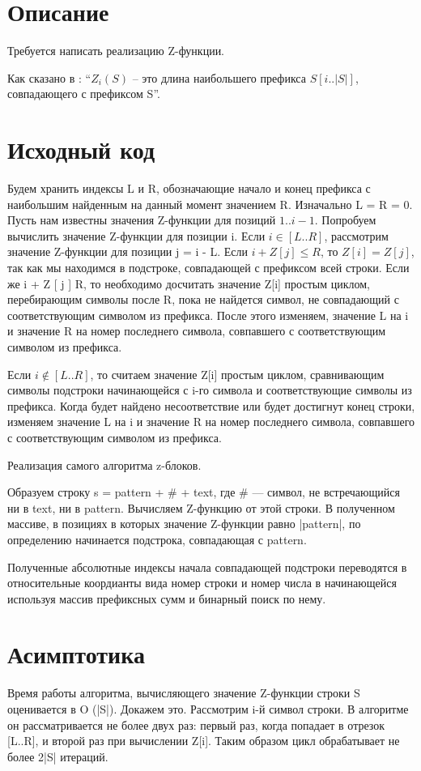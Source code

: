 \section{Описание}
Требуется написать реализацию Z-функции.

Как сказано в \cite{Gusfield}: \enquote{$Z_i(S)$ -- это длина наибольшего префикса $S[i..|S|]$, совпадающего с префиксом S}.

\section{Исходный код}
Будем хранить индексы L и R, обозначающие начало и конец префикса с наибольшим найденным на данный момент значением R. Изначально L = R = 0. 
Пусть нам известны значения Z-функции для позиций $1..i - 1$. Попробуем вычислить значение Z-функции для позиции i. Если $i \in [L..R]$, 
рассмотрим значение Z-функции для позиции j = i - L. Если $i + Z [ j ] \leq R$, то $Z [ i ] = Z [ j ]$, так как мы находимся в подстроке,
совпадающей с префиксом всей строки. Если же i + Z [ j ]  R, то необходимо досчитать значение Z[i] простым циклом, перебирающим символы 
после R, пока не найдется символ, не совпадающий с соответствующим символом из префикса. После этого изменяем, значение L на i и значение 
R на номер последнего символа, совпавшего с соответствующим символом из префикса.

Если $i \notin [L..R]$, то считаем значение Z[i] простым циклом, сравнивающим символы подстроки начинающейся с i-го
символа и соответствующие символы из префикса. Когда будет найдено несоответствие или будет достигнут конец строки, изменяем значение L 
на i и значение R на номер последнего символа, совпавшего с соответствующим символом из префикса. 

Реализация самого алгоритма z-блоков.

Образуем строку s = pattern + \# + text, где \# — символ, не встречающийся ни в text, ни в pattern. Вычисляем Z-функцию от этой строки.
В полученном массиве, в позициях в которых значение Z-функции равно |pattern|, по определению начинается подстрока, совпадающая с pattern. 

Полученные абсолютные индексы начала совпадающей подстроки переводятся в относительные коордианты вида номер строки и номер числа в начинающейся
используя массив префиксных сумм и бинарный поиск по нему. 

\section{Асимптотика}
Время работы алгоритма, вычисляющего значение Z-функции строки S оценивается в O (|S|). Докажем это.
Рассмотрим i-й символ строки. В алгоритме он рассматривается не более двух раз: первый раз, когда попадает в отрезок [L..R],
и второй раз при вычислении Z[i]. Таким образом цикл обрабатывает не более 2|S| итераций. 

